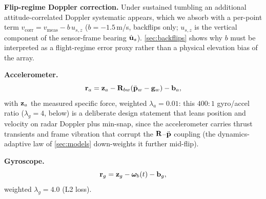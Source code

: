 \textbf{Flip-regime Doppler correction.}
Under sustained tumbling an additional attitude-correlated Doppler
systematic appears, which we absorb with a per-point term
$v_{\mathrm{corr}} = v_{\mathrm{meas}} - b\,u_{s,z}$ ($b{=}{-}1.5$\,m/s,
backflips only; $u_{s,z}$ is the vertical component of the
sensor-frame bearing $\hat{\mathbf{u}}_s$).  \autoref{sec:backflips} shows why $b$ must be
interpreted as a flight-regime error proxy rather than a physical
elevation bias of the array.

\textbf{Accelerometer.}
\begin{equation}
  \mathbf{r}_a = \mathbf{z}_a - \mathbf{R}_{bw}\!\left(\ddot{\mathbf{p}}_w - \mathbf{g}_w\right) - \mathbf{b}_a,
  \label{eq:accel}
\end{equation}
with $\mathbf{z}_a$ the measured specific force,
weighted $\lambda_a = 0.01$: this $400{:}1$ gyro/accel ratio
($\lambda_g{=}4$, below) is a deliberate design statement that leans
position and velocity on radar Doppler plus min-snap, since the
accelerometer carries thrust transients and frame vibration that
corrupt the $\mathbf{R}$--$\ddot{\mathbf{p}}$ coupling (the dynamics-adaptive law of
\autoref{sec:models} down-weights it further mid-flip).

\textbf{Gyroscope.}
\begin{equation}
  \mathbf{r}_g = \mathbf{z}_g - \boldsymbol{\omega}_b(t) - \mathbf{b}_g,
  \label{eq:gyro}
\end{equation}
weighted $\lambda_g = 4.0$ (L2 loss).

